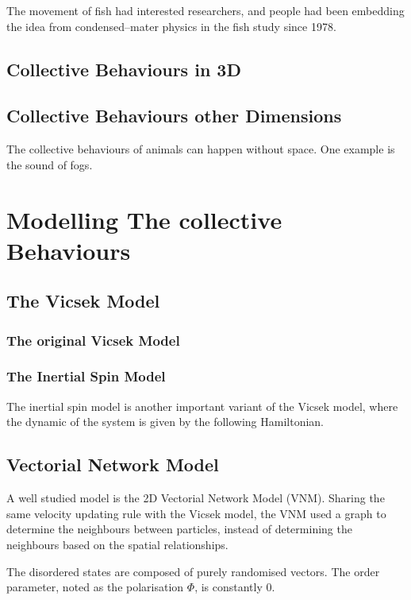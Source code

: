 \documentclass[11pt,twoside]{report}
\begin{document}
The movement of fish had interested researchers, and people had been embedding the idea from condensed--mater physics in the fish study since 1978. \cite{}

\subsection{Collective Behaviours in 3D}

\subsection{Collective Behaviours other Dimensions}

The collective behaviours of animals can happen without space. One example is the sound of fogs.


\section{Modelling The collective Behaviours}

\label{ch2-review-model}


\subsection{The Vicsek Model}

\subsubsection{The original Vicsek Model}

\subsubsection{The Inertial Spin Model}

The inertial spin model is another important variant of the Vicsek model, where the dynamic of the system is given by the following Hamiltonian.


\subsection{Vectorial Network Model}

A well studied model is the 2D Vectorial Network Model (VNM). Sharing the same velocity updating rule with the Vicsek model, the VNM used a graph to determine the neighbours between particles, instead of determining the neighbours based on the spatial relationships. 

The disordered states are composed of purely randomised vectors. The order parameter, noted as the polarisation $\Phi$, is constantly 0.
\end{document}
